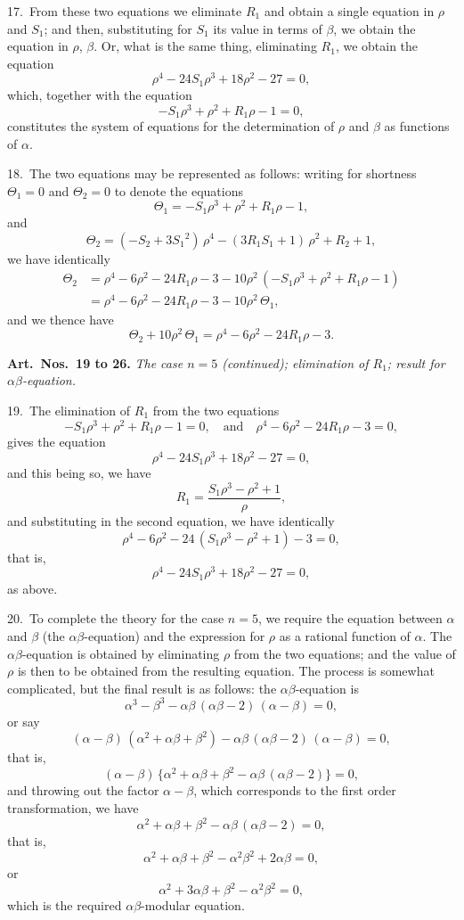 \documentclass[12pt,a4paper]{article}
\theoremstyle{definition}
\begin{document}
17.\ From these two equations we eliminate $R_1$ and obtain a single equation in $\rho$ and
$S_1$; and then, substituting for $S_1$ its value in terms of $\beta$, we obtain the equation in
$\rho$, $\beta$. Or, what is the same thing, eliminating $R_1$, we obtain the equation
\[
\rho^4 - 24S_1 \rho^3 + 18\rho^2 - 27 = 0,
\]
which, together with the equation
\[
-S_1 \rho^3 + \rho^2 + R_1 \rho - 1 = 0,
\]
constitutes the system of equations for the determination of $\rho$ and $\beta$ as functions of $\alpha$.

18.\ The two equations may be represented as follows: writing for shortness
$\Theta_1 = 0$ and $\Theta_2 = 0$ to denote the equations
\[
\Theta_1 = -S_1 \rho^3 + \rho^2 + R_1 \rho - 1,
\]
and
\[
\Theta_2 = (-S_2 + 3S_1{}^2)\, \rho^4 - (3R_1 S_1 + 1)\, \rho^2 + R_2 + 1,
\]
we have identically
\begin{align*}
\Theta_2 &= \rho^4 - 6\rho^2 - 24R_1 \rho - 3
- 10\rho^2\, (-S_1 \rho^3 + \rho^2 + R_1 \rho - 1)\\
&= \rho^4 - 6\rho^2 - 24R_1 \rho - 3 - 10\rho^2\, \Theta_1,
\end{align*}
and we thence have
\[
\Theta_2 + 10\rho^2\, \Theta_1 = \rho^4 - 6\rho^2 - 24R_1 \rho - 3.
\]

\newpage
\noindent\textbf{Art.\ Nos.\ 19 to 26.} \textit{The case $n = 5$ (continued); elimination of $R_1$; result for $\alpha\beta$-equation.}

19.\ The elimination of $R_1$ from the two equations
\[
-S_1 \rho^3 + \rho^2 + R_1 \rho - 1 = 0, \quad \text{and} \quad
\rho^4 - 6\rho^2 - 24R_1 \rho - 3 = 0,
\]
gives the equation
\[
\rho^4 - 24S_1 \rho^3 + 18\rho^2 - 27 = 0,
\]
and this being so, we have
\[
R_1 = \frac{S_1 \rho^3 - \rho^2 + 1}{\rho},
\]
and substituting in the second equation, we have identically
\[
\rho^4 - 6\rho^2 - 24\, (S_1 \rho^3 - \rho^2 + 1) - 3 = 0,
\]
that is,
\[
\rho^4 - 24S_1 \rho^3 + 18\rho^2 - 27 = 0,
\]
as above.

20.\ To complete the theory for the case $n = 5$, we require the equation between $\alpha$
and $\beta$ (the $\alpha\beta$-equation) and the expression for $\rho$ as a rational function of $\alpha$.
The $\alpha\beta$-equation is obtained by eliminating $\rho$ from the two equations; and the value
of $\rho$ is then to be obtained from the resulting equation. The process is somewhat
complicated, but the final result is as follows: the $\alpha\beta$-equation is
\[
\alpha^3 - \beta^3 - \alpha\beta\, (\alpha\beta - 2)\, (\alpha - \beta) = 0,
\]
or say
\[
(\alpha - \beta)\, (\alpha^2 + \alpha\beta + \beta^2) - \alpha\beta\, (\alpha\beta - 2)\, (\alpha - \beta) = 0,
\]
that is,
\[
(\alpha - \beta)\, \{\alpha^2 + \alpha\beta + \beta^2 - \alpha\beta\, (\alpha\beta - 2)\} = 0,
\]
and throwing out the factor $\alpha - \beta$, which corresponds to the first order transformation,
we have
\[
\alpha^2 + \alpha\beta + \beta^2 - \alpha\beta\, (\alpha\beta - 2) = 0,
\]
that is,
\[
\alpha^2 + \alpha\beta + \beta^2 - \alpha^2\beta^2 + 2\alpha\beta = 0,
\]
or
\[
\alpha^2 + 3\alpha\beta + \beta^2 - \alpha^2\beta^2 = 0,
\]
which is the required $\alpha\beta$-modular equation.
\end{document}
